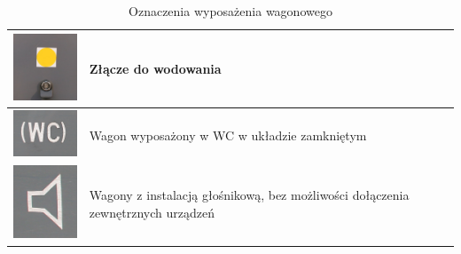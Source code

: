 \begin{table}
	\caption{Oznaczenia wyposażenia wagonowego}
	\label{tab:opisywagonowe}
	\begin{tabular}{|c|m{8cm}|}
		\hline
		\includegraphics[width=2.5cm]{skryptkierownik-img/skryptkierownik-img035.jpg} & Złącze do wodowania\\
		\hline
	\includegraphics[width=2.5cm]{skryptkierownik-img/skryptkierownik-img036.jpg} & Wagon wyposażony w WC w układzie zamkniętym\\
	\hline
		\includegraphics[width=2cm]{skryptkierownik-img/skryptkierownik-img037.jpg} & Wagony z instalacją głośnikową, bez możliwości dołączenia zewnętrznych urządzeń\\\hline
	\end{tabular}
\end{table}
\pagebreak

